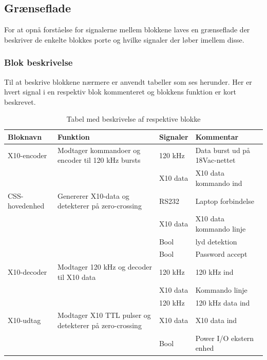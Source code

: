 \clearpage
\newpage

\begin{table}[H] %
\subsection{Grænseflade}
For at opnå forståelse for signalerne mellem blokkene laves en grænseflade der beskriver de enkelte blokkes porte og hvilke signaler der løber imellem disse.

\subsubsection{Blok beskrivelse}
Til at beskrive blokkene nærmere er anvendt tabeller som ses herunder. Her er hvert signal i en respektiv blok kommenteret og blokkens funktion er kort beskrevet. 

\caption{Tabel med beskrivelse af respektive blokke}
\begin{small}
\begin{tabular}{|p{}|p{}|p{}|p{}|}
\hline
\textbf{Bloknavn} & \textbf{Funktion} & \textbf{Signaler} & \textbf{Kommentar} \\ \hline

X10-encoder & Modtager kommandoer og encoder til 120 kHz bursts & 120 kHz & Data burst ud på 18Vac-nettet \\ \cline{3-4}	
& & X10 data & X10 data kommando ind \\ \hline

CSS-hovedenhed & Genererer X10-data og detekterer på zero-crossing & RS232 & Laptop forbindelse \\ \cline{3-4}
& & X10 data & X10 data kommando linje \\ \cline{3-4}
& & Bool & lyd detektion \\ \cline{3-4}
& & Bool & Password accept \\ \hline

X10-decoder & Modtager 120 kHz og decoder til X10 data & 120 kHz & 120 kHz ind \\ \cline{3-4}
& & X10 data & Kommando linje \\ \cline{3-4}
& & 120 kHz & 120 kHz data ind \\ \hline

X10-udtag & Modtager X10 TTL pulser og detekterer på zero-crossing & X10 data & X10 data ind \\ \cline{3-4}
&& Bool & Power I/O ekstern enhed \\ \hline 
\end{tabular}
\end{small}
\label{table:Bloktabel}
\end{table}


